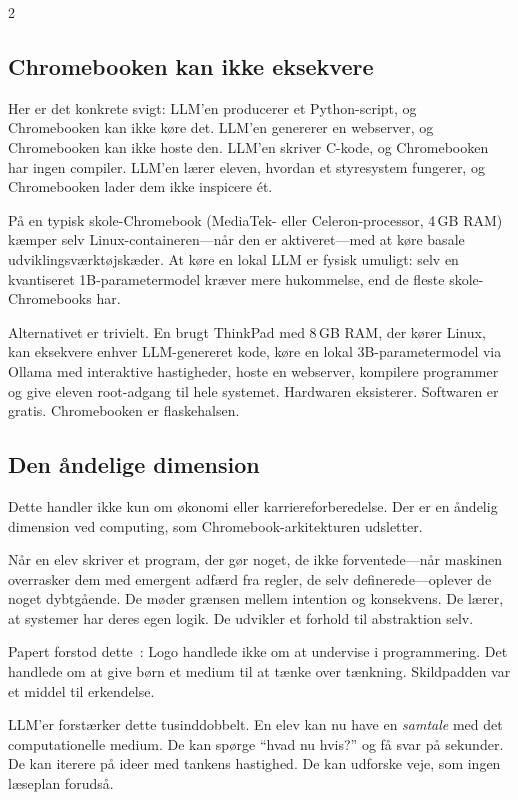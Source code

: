 \documentclass[11pt, a4paper]{article}
\begin{document}
\begin{multicols}{2}
\subsection{Chromebooken kan ikke eksekvere}

Her er det konkrete svigt: LLM'en producerer et Python-script, og Chromebooken kan ikke køre det. LLM'en genererer en webserver, og Chromebooken kan ikke hoste den. LLM'en skriver C-kode, og Chromebooken har ingen compiler. LLM'en lærer eleven, hvordan et styresystem fungerer, og Chromebooken lader dem ikke inspicere ét.

På en typisk skole-Chromebook (MediaTek- eller Celeron-processor, 4\,GB RAM) kæmper selv Linux-containeren---når den er aktiveret---med at køre basale udviklingsværktøjskæder. At køre en lokal LLM er fysisk umuligt: selv en kvantiseret 1B-parametermodel kræver mere hukommelse, end de fleste skole-Chromebooks har.

Alternativet er trivielt. En brugt ThinkPad med 8\,GB RAM, der kører Linux, kan eksekvere enhver LLM-genereret kode, køre en lokal 3B-parametermodel via Ollama med interaktive hastigheder, hoste en webserver, kompilere programmer og give eleven root-adgang til hele systemet. Hardwaren eksisterer. Softwaren er gratis. Chromebooken er flaskehalsen.

\subsection{Den åndelige dimension}

Dette handler ikke kun om økonomi eller karriereforberedelse. Der er en åndelig dimension ved computing, som Chromebook-arkitekturen udsletter.

Når en elev skriver et program, der gør noget, de ikke forventede---når maskinen overrasker dem med emergent adfærd fra regler, de selv definerede---oplever de noget dybtgående. De møder grænsen mellem intention og konsekvens. De lærer, at systemer har deres egen logik. De udvikler et forhold til abstraktion selv.

Papert forstod dette~\citep{papert1980mindstorms}: Logo handlede ikke om at undervise i programmering. Det handlede om at give børn et medium til at tænke over tænkning. Skildpadden var et middel til erkendelse.

LLM'er forstærker dette tusinddobbelt. En elev kan nu have en \emph{samtale} med det computationelle medium. De kan spørge ``hvad nu hvis?'' og få svar på sekunder. De kan iterere på ideer med tankens hastighed. De kan udforske veje, som ingen læseplan forudså.


\end{multicols}
\end{document}
